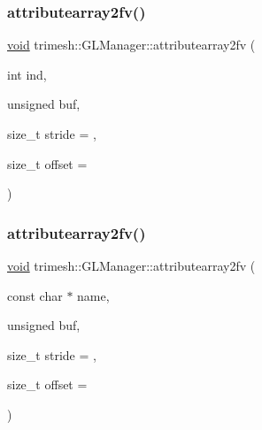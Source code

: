 \subsubsection{\texorpdfstring{attributearray2fv()}{attributearray2fv()}\hspace{0.1cm}{\footnotesize\ttfamily [5/6]}}
{\footnotesize\ttfamily \hyperlink{namespacetrimesh_a784ddfd979e1c579bda795a8edfc3f43}{void} trimesh\+::\+G\+L\+Manager\+::attributearray2fv (\begin{DoxyParamCaption}\item[{int}]{ind,  }\item[{unsigned}]{buf,  }\item[{size\+\_\+t}]{stride = {},  }\item[{size\+\_\+t}]{offset = {} }\end{DoxyParamCaption})\hspace{0.3cm}{\ttfamily [inline]}}

\mbox{\label{classtrimesh_1_1GLManager_a29caf422aaf3449fc08b4699239a4743}} 
\subsubsection{\texorpdfstring{attributearray2fv()}{attributearray2fv()}\hspace{0.1cm}{\footnotesize\ttfamily [6/6]}}
{\footnotesize\ttfamily \hyperlink{namespacetrimesh_a784ddfd979e1c579bda795a8edfc3f43}{void} trimesh\+::\+G\+L\+Manager\+::attributearray2fv (\begin{DoxyParamCaption}\item[{const char $\ast$}]{name,  }\item[{unsigned}]{buf,  }\item[{size\+\_\+t}]{stride = {},  }\item[{size\+\_\+t}]{offset = {} }\end{DoxyParamCaption})\hspace{0.3cm}{\ttfamily [inline]}}

\mbox{\label{classtrimesh_1_1GLManager_a9acabddda9e00d3fb4d4725a7f6ac1a5}} 
